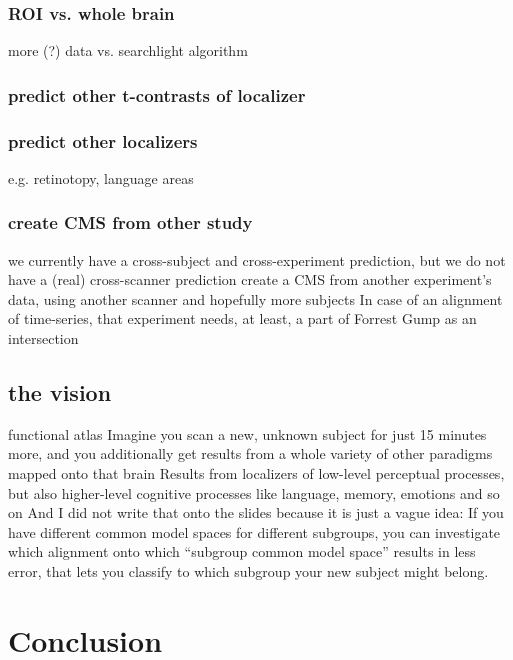 \subsubsection{ROI vs. whole brain}
%
more (?) data vs. searchlight algorithm


\subsubsection{predict other t-contrasts of localizer}


\subsubsection{predict other localizers}
%
e.g. retinotopy, language areas


\subsubsection{create CMS from other study}
%
we currently have a cross-subject and cross-experiment prediction,
but we do not have a (real) cross-scanner prediction
%
create a CMS from another experiment’s data,
using another scanner and hopefully more subjects
%
In case of an alignment of time-series,
that experiment needs, at least, a part of Forrest Gump as an intersection


\subsection{the vision}
%
functional atlas
%
Imagine you scan a new, unknown subject for just 15 minutes more, and you
additionally get results from a whole variety of other paradigms mapped onto
that brain
%
Results from localizers of low-level perceptual processes, but also higher-level
cognitive processes like language, memory, emotions and so on
%
And I did not write that onto the slides because it is just a vague idea:
%
If you have different common model spaces for different subgroups, you can
investigate which alignment onto which ``subgroup common model space'' results
in less error, that lets you classify to which subgroup your new subject might
belong.


\section{Conclusion}
